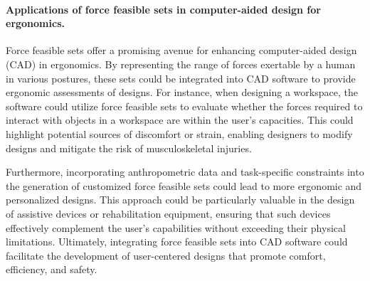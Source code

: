 \paragraph*{Applications of force feasible sets in computer-aided design for ergonomics.}
Force feasible sets offer a promising avenue for enhancing computer-aided design (CAD) in ergonomics. By representing the range of forces exertable by a human in various postures, these sets could be integrated into CAD software to provide ergonomic assessments of designs. For instance, when designing a workspace, the software could utilize force feasible sets to evaluate whether the forces required to interact with objects in a workspace are within the user's capacities. This could highlight potential sources of discomfort or strain, enabling designers to modify designs and mitigate the risk of musculoskeletal injuries.

Furthermore, incorporating anthropometric data and task-specific constraints into the generation of customized force feasible sets could lead to more ergonomic and personalized designs. This approach could be particularly valuable in the design of assistive devices or rehabilitation equipment, ensuring that such devices effectively complement the user's capabilities without exceeding their physical limitations. Ultimately, integrating force feasible sets into CAD software could facilitate the development of user-centered designs that promote comfort, efficiency, and safety.




